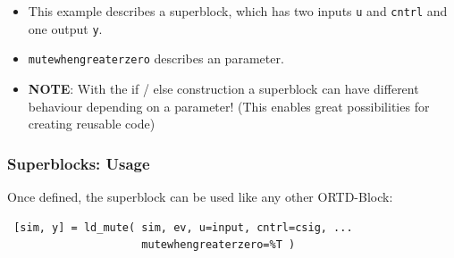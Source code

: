 \documentclass[serif,9pt,xcolor=dvipsnames]{beamer}
\begin{document}
\begin{frame}[fragile]
%     

\begin{itemize}
 \item This example describes a superblock, which has two inputs \texttt{u} and \texttt{cntrl} and one output \texttt{y}.
\item \texttt{mutewhengreaterzero} describes an parameter.
\item \textbf{NOTE}: With the if / else construction a superblock can have different behaviour depending on a parameter! (This enables great possibilities for creating reusable code)
\end{itemize}


\end{frame}


\begin{frame}[fragile]
 \frametitle{Superblocks: Usage}
 
  Once defined, the superblock can be used like any other ORTD-Block:

\vspace{1.5cm}
 
 {\small 
\begin{lstlisting} 
 [sim, y] = ld_mute( sim, ev, u=input, cntrl=csig, ...
                     mutewhengreaterzero=%T ) 
\end{lstlisting}}

\end{frame}
\end{document}
